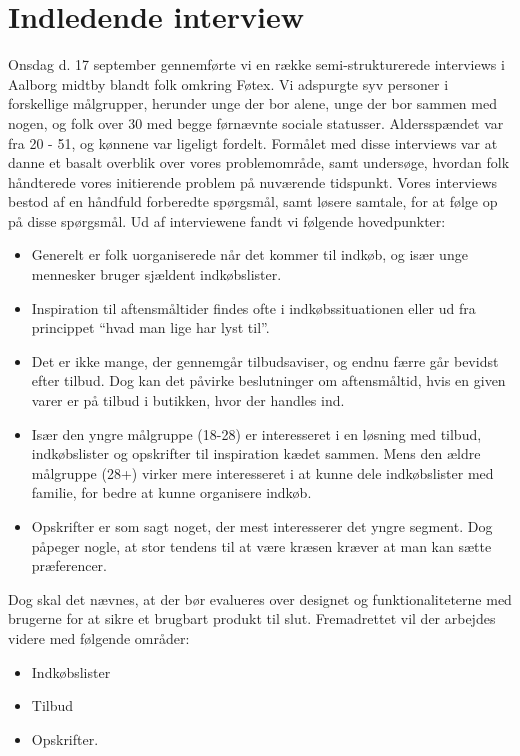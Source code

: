 \section{Indledende interview}
Onsdag d. 17 september gennemførte vi en række semi-strukturerede interviews i Aalborg midtby blandt folk omkring Føtex.
Vi adspurgte syv personer i forskellige målgrupper, herunder unge der bor alene, unge der bor sammen med nogen, og  folk over 30 med begge førnævnte sociale statusser.
Aldersspændet var fra 20 - 51, og kønnene var ligeligt fordelt.
Formålet med disse interviews var at danne et basalt overblik over vores problemområde, samt undersøge, hvordan folk håndterede vores initierende problem på nuværende tidspunkt.
Vores interviews bestod af en håndfuld forberedte spørgsmål, samt løsere samtale, for at følge op på disse spørgsmål.
Ud af interviewene fandt vi følgende hovedpunkter:
\begin{itemize}
	\item Generelt er folk uorganiserede når det kommer til indkøb, og især unge mennesker bruger sjældent indkøbslister.
	\item Inspiration til aftensmåltider findes ofte i indkøbssituationen eller ud fra princippet “hvad man lige har lyst til”.
	\item Det er ikke mange, der gennemgår tilbudsaviser, og endnu færre går bevidst efter tilbud.
	Dog kan det påvirke beslutninger om aftensmåltid, hvis en given varer er på tilbud i butikken, hvor der handles ind.
	\item Især den yngre målgruppe (18-28) er interesseret i en løsning med tilbud, indkøbslister og opskrifter til inspiration kædet sammen. Mens den ældre målgruppe (28+) virker mere interesseret i at kunne dele indkøbslister med familie, for bedre at kunne organisere indkøb.
	\item Opskrifter er som sagt noget, der mest interesserer det yngre segment.
	Dog påpeger nogle, at stor tendens til at være kræsen kræver at man kan sætte præferencer.
\end{itemize}

Dog skal det nævnes, at der bør evalueres over designet og funktionaliteterne med brugerne for at sikre et brugbart produkt til slut.
Fremadrettet vil der arbejdes videre med følgende områder:

\begin{itemize}
	\item Indkøbslister
	\item Tilbud
	\item Opskrifter.
\end{itemize}

